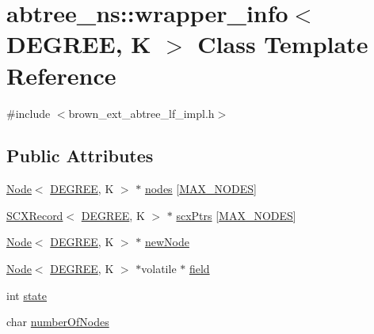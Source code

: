\hypertarget{classabtree__ns_1_1wrapper__info}{}\section{abtree\+\_\+ns\+:\+:wrapper\+\_\+info$<$ D\+E\+G\+R\+EE, K $>$ Class Template Reference}
\label{classabtree__ns_1_1wrapper__info}


{\ttfamily \#include $<$brown\+\_\+ext\+\_\+abtree\+\_\+lf\+\_\+impl.\+h$>$}

\subsection*{Public Attributes}
\begin{DoxyCompactItemize}
\item 
\hyperlink{structabtree__ns_1_1Node}{Node}$<$ \hyperlink{brown__sigouin__abtree__kcas_2adapter_8h_a5d88b17d70c985f2f2b8e987037fd6dd}{D\+E\+G\+R\+EE}, K $>$ $\ast$ \hyperlink{classabtree__ns_1_1wrapper__info_a6babdd3bb46ab432e506401eef25a5b2}{nodes} \mbox{[}\hyperlink{classabtree__ns_1_1wrapper__info_a8ebdd932eb6c4c88615fbb76b8419d9e}{M\+A\+X\+\_\+\+N\+O\+D\+ES}\mbox{]}
\item 
\hyperlink{structabtree__ns_1_1SCXRecord}{S\+C\+X\+Record}$<$ \hyperlink{brown__sigouin__abtree__kcas_2adapter_8h_a5d88b17d70c985f2f2b8e987037fd6dd}{D\+E\+G\+R\+EE}, K $>$ $\ast$ \hyperlink{classabtree__ns_1_1wrapper__info_a531a8a2aaf6256dd25d0b6ca8a1e6ced}{scx\+Ptrs} \mbox{[}\hyperlink{classabtree__ns_1_1wrapper__info_a8ebdd932eb6c4c88615fbb76b8419d9e}{M\+A\+X\+\_\+\+N\+O\+D\+ES}\mbox{]}
\item 
\hyperlink{structabtree__ns_1_1Node}{Node}$<$ \hyperlink{brown__sigouin__abtree__kcas_2adapter_8h_a5d88b17d70c985f2f2b8e987037fd6dd}{D\+E\+G\+R\+EE}, K $>$ $\ast$ \hyperlink{classabtree__ns_1_1wrapper__info_a5517be33957e4aace41140dad1738ef4}{new\+Node}
\item 
\hyperlink{structabtree__ns_1_1Node}{Node}$<$ \hyperlink{brown__sigouin__abtree__kcas_2adapter_8h_a5d88b17d70c985f2f2b8e987037fd6dd}{D\+E\+G\+R\+EE}, K $>$ $\ast$volatile $\ast$ \hyperlink{classabtree__ns_1_1wrapper__info_a768ca52b1b5ec8730ea982e9a8aaeb48}{field}
\item 
int \hyperlink{classabtree__ns_1_1wrapper__info_a433955bf061f62ec2942f2eacdd5a299}{state}
\item 
char \hyperlink{classabtree__ns_1_1wrapper__info_a43563c0b9d50c77a1619f219e09a6eb0}{number\+Of\+Nodes}

\end{DoxyCompactItemize}
